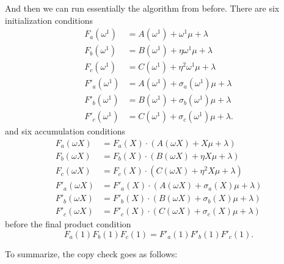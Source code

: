 And then we can run essentially the algorithm from before. There are six
initialization conditions 
\begin{equation}
\label{copycheck-init}
\begin{aligned}
F_{a}( \omega^{1} ) & = A( \omega^{1} ) + \omega^{1}\mu + \lambda \\
F_{b}( \omega^{1} ) & = B( \omega^{1} ) + \eta\omega^{1}\mu + \lambda \\
F_{c}( \omega^{1} ) & = C( \omega^{1} ) + \eta^{2}\omega^{1}\mu + \lambda \\
F'_{a}( \omega^{1} ) & = A( \omega^{1} ) + \sigma_{a}( \omega^{1} )\mu + \lambda \\
F'_{b}( \omega^{1} ) & = B( \omega^{1} ) + \sigma_{b}( \omega^{1} )\mu + \lambda \\
F'_{c}( \omega^{1} ) & = C( \omega^{1} ) + \sigma_{c}( \omega^{1} )\mu + \lambda.
\end{aligned}
\end{equation}
and six accumulation conditions 
\begin{equation}
\label{copycheck-accum}
\begin{aligned}
F_{a}(\omega X) & = F_{a}(X) \cdot ( A(\omega X) + X\mu + \lambda ) \\
F_{b}(\omega X) & = F_{b}(X) \cdot ( B(\omega X) + \eta X\mu + \lambda ) \\
F_{c}(\omega X) & = F_{c}(X) \cdot ( C(\omega X) + \eta^{2}X\mu + \lambda ) \\
F'_{a}(\omega X) & = F'_{a}(X) \cdot ( A(\omega X) + \sigma_{a}(X)\mu + \lambda ) \\
F'_{b}(\omega X) & = F'_{b}(X) \cdot ( B(\omega X) + \sigma_{b}(X)\mu + \lambda ) \\
F'_{c}(\omega X) & = F'_{c}(X) \cdot ( C(\omega X) + \sigma_{c}(X)\mu + \lambda )
\end{aligned}
\end{equation}
before the final product condition
\begin{equation}
\label{copycheck-final}
F_{a}(1)F_{b}(1)F_{c}(1) = F'_{a}(1)F'_{b}(1)F'_{c}(1).
\end{equation}

To summarize, the copy check goes as follows:

